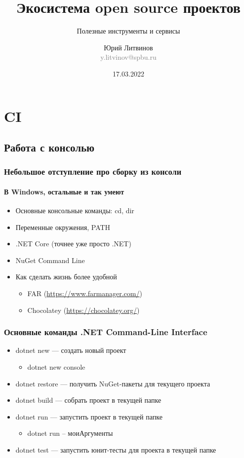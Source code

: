 \documentclass[xetex,mathserif,serif]{beamer}
\title{Экосистема open source проектов}
\subtitle{Полезные инструменты и сервисы}
\author[Юрий Литвинов]{Юрий Литвинов\\\small{\textcolor{gray}{y.litvinov@spbu.ru}}}
\date{17.03.2022}
\begin{document}
    \frame{\titlepage}

    \section{CI}

    \subsection{Работа с консолью}

    \begin{frame}
        \frametitle{Небольшое отступление про сборку из консоли}
        \framesubtitle{В Windows, остальные и так умеют}
        \begin{itemize}
            \item Основные консольные команды: cd, dir
            \item Переменные окружения, PATH
            \item .NET Core (точнее уже просто .NET)
            \item NuGet Command Line
            \item Как сделать жизнь более удобной
            \begin{itemize}
                \item FAR (\url{https://www.farmanager.com/})
                \item Chocolatey (\url{https://chocolatey.org/})
            \end{itemize}
        \end{itemize}
    \end{frame}

    \begin{frame}
        \frametitle{Основные команды .NET Command-Line Interface}
        \begin{itemize}
            \item dotnet new --- создать новый проект
            \begin{itemize}
                \item dotnet new console
            \end{itemize}
            \item dotnet restore --- получить NuGet-пакеты для текущего проекта
            \item dotnet build --- собрать проект в текущей папке
            \item dotnet run --- запустить проект в текущей папке
            \begin{itemize}
                \item dotnet run -- моиАргументы
            \end{itemize}
            \item dotnet test --- запустить юнит-тесты для проекта в текущей папке
        \end{itemize}
    \end{frame}
\end{document}
